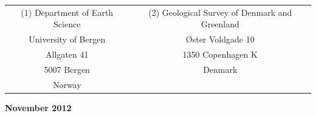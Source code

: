 \begin{titlepage}
\begin{center}
\vfill
\vfill
\vfill

\begin{tabular}{cc}
(1) Department of Earth Science & (2) Geological Survey of Denmark and Greenland \\
University of Bergen & \O ster Voldgade 10 \\
Allgaten 41 & 1350 Copenhagen K \\
5007 Bergen & Denmark \\
Norway &  \\
\end{tabular}

\vfill
\vfill
\vfill
\vfill
\vfill
\vfill
\vfill
\vfill
\textbf{November 2012}
\end{center}
\end{titlepage}

